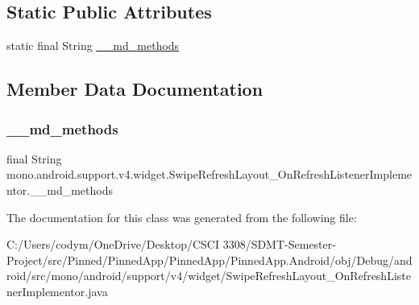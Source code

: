 \subsection*{Static Public Attributes}
\begin{DoxyCompactItemize}
\item 
static final String \hyperlink{classmono_1_1android_1_1support_1_1v4_1_1widget_1_1_swipe_refresh_layout___on_refresh_listener_implementor_a8eae272ca1cc576f55b51a0e86c522b2}{\+\_\+\+\_\+md\+\_\+methods}
\end{DoxyCompactItemize}


\subsection{Member Data Documentation}
\mbox{\label{classmono_1_1android_1_1support_1_1v4_1_1widget_1_1_swipe_refresh_layout___on_refresh_listener_implementor_a8eae272ca1cc576f55b51a0e86c522b2}} 
\subsubsection{\texorpdfstring{\+\_\+\+\_\+md\+\_\+methods}{\_\_md\_methods}}
{\footnotesize\ttfamily final String mono.\+android.\+support.\+v4.\+widget.\+Swipe\+Refresh\+Layout\+\_\+\+On\+Refresh\+Listener\+Implementor.\+\_\+\+\_\+md\+\_\+methods\hspace{0.3cm}{\ttfamily [static]}}



The documentation for this class was generated from the following file\+:\begin{DoxyCompactItemize}
\item 
C\+:/\+Users/codym/\+One\+Drive/\+Desktop/\+C\+S\+C\+I 3308/\+S\+D\+M\+T-\/\+Semester-\/\+Project/src/\+Pinned/\+Pinned\+App/\+Pinned\+App/\+Pinned\+App.\+Android/obj/\+Debug/android/src/mono/android/support/v4/widget/Swipe\+Refresh\+Layout\+\_\+\+On\+Refresh\+Listener\+Implementor.\+java\end{DoxyCompactItemize}
